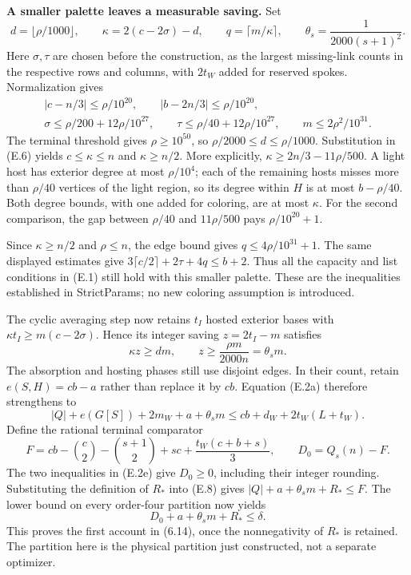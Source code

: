 \documentclass[english,11pt,a4paper]{article}
\begin{document}
\textbf{A smaller palette leaves a measurable saving.} Set \[
d=\lfloor\rho/1000\rfloor,\qquad
\kappa=2(c-2\sigma)-d,\qquad
q=\lceil m/\kappa\rceil,\qquad
\theta_s=\frac1{2000(s+1)^2}.
\tag{E.6}
\] Here \(\sigma,\tau\) are chosen before the construction, as the largest missing-link counts in the respective rows and columns, with \(2t_W\) added for reserved spokes. Normalization gives \[
\begin{gathered}
|c-n/3|\le\rho/10^{20},\qquad
|b-2n/3|\le\rho/10^{20},\\
\sigma\le\rho/200+12\rho/10^{27},\qquad
\tau\le\rho/40+12\rho/10^{27},\qquad
m\le2\rho^2/10^{31}.
\end{gathered}
\] The terminal threshold gives \(\rho\ge10^{50}\), so \(\rho/2000\le d\le\rho/1000\). Substitution in (E.6) yields \(c\le\kappa\le n\) and \(\kappa\ge n/2\). More explicitly, \(\kappa\ge2n/3-11\rho/500\). A light host has exterior degree at most \(\rho/10^4\); each of the remaining hosts misses more than \(\rho/40\) vertices of the light region, so its degree within \(H\) is at most \(b-\rho/40\). Both degree bounds, with one added for coloring, are at most \(\kappa\). For the second comparison, the gap between \(\rho/40\) and \(11\rho/500\) pays \(\rho/10^{20}+1\).

Since \(\kappa\ge n/2\) and \(\rho\le n\), the edge bound gives \(q\le4\rho/10^{31}+1\). The same displayed estimates give \(3\lceil c/2\rceil+2\tau+4q\le b+2\). Thus all the capacity and list conditions in (E.1) still hold with this smaller palette. These are the inequalities established in {\ttfamily\small StrictParams}; no new coloring assumption is introduced.

The cyclic averaging step now retains \(t_I\) hosted exterior bases with \(\kappa t_I\ge m(c-2\sigma)\). Hence its integer saving \(z=2t_I-m\) satisfies \[
\kappa z\ge dm,\qquad
z\ge\frac{\rho m}{2000n}=\theta_s m.
\tag{E.7}
\] The absorption and hosting phases still use disjoint edges. In their count, retain \(e(S,H)=cb-a\) rather than replace it by \(cb\). Equation (E.2a) therefore strengthens to \[
|Q|+e(G[S])+2m_W+a+\theta_s m
\le cb+d_W+2t_W(L+t_W).
\tag{E.8}
\] Define the rational terminal comparator \[
F=cb-\binom c2-\binom{s+1}2+sc+
       \frac{t_W(c+b+s)}3,\qquad
D_0=Q_s(n)-F.
\] The two inequalities in (E.2e) give \(D_0\ge0\), including their integer rounding. Substituting the definition of \(R_*\) into (E.8) gives \(|Q|+a+\theta_s m+R_*\le F\). The lower bound on every order-four partition now yields \[
D_0+a+\theta_s m+R_*\le\delta.
\tag{E.9}
\] This proves the first account in (6.14), once the nonnegativity of \(R_*\) is retained. The partition here is the physical partition just constructed, not a separate optimizer.
\end{document}
